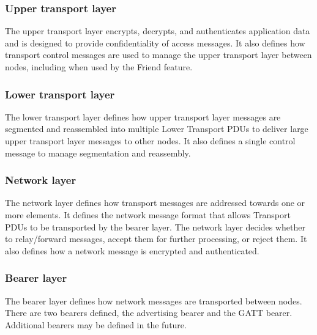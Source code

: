 \documentclass[\main/main.tex]{subfiles}
\begin{document}
\subsubsection{Upper transport layer}
The upper transport layer encrypts, decrypts, and authenticates application data and is designed to provide confidentiality of access messages. It also defines how transport control messages are used to manage the upper transport layer between nodes, including when used by the Friend feature.

\subsubsection{Lower transport layer}
The lower transport layer defines how upper transport layer messages are segmented and reassembled into multiple Lower Transport PDUs to deliver large upper transport layer messages to other nodes. It also defines a single control message to manage segmentation and reassembly.

\subsubsection{Network layer}
The network layer defines how transport messages are addressed towards one or more elements. It
defines the network message format that allows Transport PDUs to be transported by the bearer layer.
The network layer decides whether to relay/forward messages, accept them for further processing, or
reject them. It also defines how a network message is encrypted and authenticated.

\subsubsection{Bearer layer}
The bearer layer defines how network messages are transported between nodes. There are two bearers
defined, the advertising bearer and the GATT bearer. Additional bearers may be defined in the future.
\end{document}
